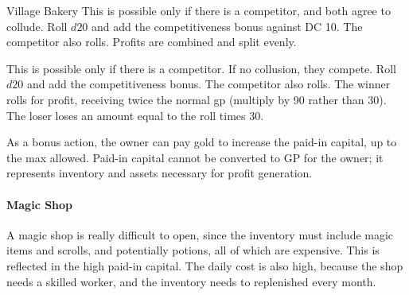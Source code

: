 \documentclass[twocolumn]{dndbook}
\begin{document}
\begin{DndMonster}[width=.5\textwidth - 8pt]{Village Bakery}
	This is possible only if there is a competitor, and both agree to collude.
	Roll $d20$ and add the competitiveness bonus against DC 10.
	The competitor also rolls. Profits are combined and split evenly.

	This is possible only if there is a competitor. If no collusion, they compete.
	Roll $d20$ and add the competitiveness bonus.
	The competitor also rolls.
	The winner rolls for profit, receiving twice the normal gp (multiply by 90 rather than 30).
	The loser loses an amount equal to the roll times 30.

	As a bonus action, the owner can pay gold to increase
	the paid-in capital, up to the max allowed.
	Paid-in capital cannot be converted to GP for the owner; it represents inventory and assets necessary for profit generation.
\end{DndMonster}

\paragraph{Magic Shop}

A magic shop is really difficult to open, since the inventory must include magic items and scrolls, and potentially potions, all of which are expensive.
This is reflected in the high paid-in capital.
The daily cost is also high, because the shop needs a skilled worker, and the inventory needs to replenished every month.
\end{document}

